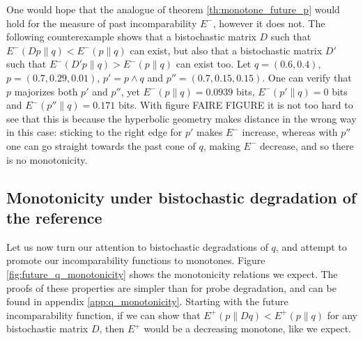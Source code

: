 One would hope that the analogue of theorem \ref{th:monotone_future_p} would hold for the measure of past incomparability $E^-$, however it does not. The following counterexample shows that a bistochastic matrix $D$ such that $E^- (Dp \parallel q) < E^- (p \parallel q)$ can exist, but also that a bistochastic matrix $D'$ such that $E^- (D'p \parallel q) > E^- (p \parallel q)$ can exist too. Let $q = (0.6, 0.4)$, $p = (0.7, 0.29, 0.01)$, $p' = p \wedge q$ and $p'' = (0.7, 0.15, 0.15)$. One can verify that $p$ majorizes both $p'$ and $p''$, yet $E^- (p \parallel q) = 0.0939$ bits, $E^- (p' \parallel q) = 0$ bits and $E^- (p'' \parallel q) = 0.171$ bits. With figure FAIRE FIGURE it is not too hard to see that this is because the hyperbolic geometry makes distance in the wrong way in this case: sticking to the right edge for $p'$ makes $E^-$ increase, whereas with $p''$ one can go straight towards the past cone of $q$, making $E^-$ decrease, and so there is no monotonicity.



\subsection{Monotonicity under bistochastic degradation of the reference} \label{sec:q_monotonicity}

Let us now turn our attention to bistochastic degradations of $q$, and attempt to promote our incomparability functions to monotones. Figure \ref{fig:future_q_monotonicity} shows the monotonicity relations we expect. The proofs of these properties are simpler than for probe degradation, and can be found in appendix \ref{app:q_monotonicity}. Starting with the future incomparability function, if we can show that $E^+(p \parallel Dq) < E^+(p \parallel q)$ for any bistochastic matrix $D$, then $E^+$ would be a decreasing monotone, like we expect.

